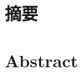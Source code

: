 \maketitle%
\MAKETITLE%
\makedeclaration%
\intobmk\chapter*{摘\quad 要}%
\setcounter{page}{1}%



\keywords{}%
\intobmk\chapter*{Abstract}%



\KEYWORDS{}%

